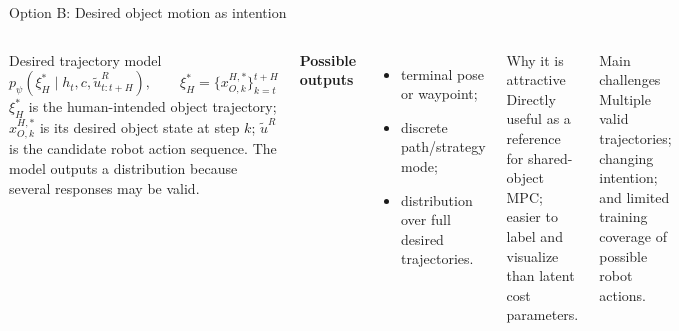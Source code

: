 \documentclass[aspectratio=169,11pt]{beamer}
\begin{document}
\begin{frame}{Option B: Desired object motion as intention}
\begin{columns}[T,onlytextwidth]
\begin{block}{Desired trajectory model}
\[
p_\psi(\xi_H^*\mid h_t,c,\tilde u^R_{t:t+H}),\qquad
\xi_H^*=\{x_{O,k}^{H,*}\}_{k=t}^{t+H}
\]
$\xi_H^*$ is the human-intended object trajectory; $x_{O,k}^{H,*}$ is its desired object state at step $k$; $\tilde u^R$ is the candidate robot action sequence. The model outputs a distribution because several responses may be valid.
\end{block}
\textbf{Possible outputs}
\begin{itemize}
  \item terminal pose or waypoint;
  \item discrete path/strategy mode;
  \item distribution over full desired trajectories.
\end{itemize}
\begin{exampleblock}{Why it is attractive}
Directly useful as a reference for shared-object MPC; easier to label and visualize than latent cost parameters.
\end{exampleblock}
\begin{alertblock}{Main challenges}
Multiple valid trajectories; changing intention; and limited training coverage of possible robot actions.
\end{alertblock}
\end{columns}
\end{frame}
\end{document}
